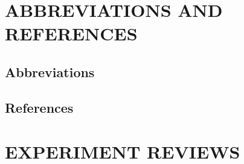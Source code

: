 \documentclass[
  a4paper,
  11pt,
  openany,
  parskip,
  toc=totoc,
  listof=totoc,
  bibliography=totoc
]{scrreprt}
\begin{document}

\chapter{ABBREVIATIONS AND REFERENCES}
\label{sec:abbreviations_references}
\section{Abbreviations}
\printglossary[type=\acronymtype, style=compactacronyms, title={}, toctitle={}]


\section{References}
\nocite{*}
\printbibliography[heading=none]




\appendix

\chapter{EXPERIMENT REVIEWS}
\label{app:experiment_reviews}


\end{document}
